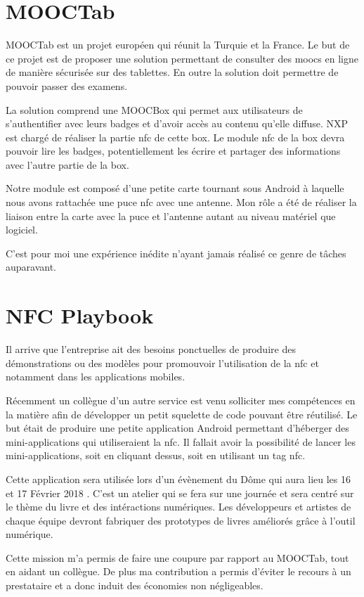 \documentclass[french,12pt,a4paper,titlepage,openright,openbib]{report}
\begin{document}
\section{MOOCTab}
MOOCTab est un projet européen qui réunit la Turquie et la France. Le but de ce projet est de proposer une solution permettant de consulter des \glspl{mooc} en ligne de manière sécurisée sur des tablettes. En outre la solution doit permettre de pouvoir passer des examens.

La solution comprend une MOOCBox qui permet aux utilisateurs de s'authentifier avec leurs badges et d'avoir accès au contenu qu'elle diffuse. NXP est chargé de réaliser la partie \gls{nfc} de cette box.
Le module \gls{nfc} de la box devra pouvoir lire les badges, potentiellement les écrire et partager des informations avec l'autre partie de la box.

Notre module est composé d'une petite carte tournant sous Android à laquelle nous avons rattachée une puce \gls{nfc} avec une antenne. Mon rôle a été de réaliser la liaison entre la carte avec la puce et l'antenne autant au niveau matériel que logiciel.

C'est pour moi une expérience inédite n'ayant jamais réalisé ce genre de tâches auparavant.
\section{NFC Playbook}
Il arrive que l'entreprise ait des besoins ponctuelles de produire des démonstrations ou des modèles pour promouvoir l'utilisation de la \gls{nfc} et notamment dans les applications mobiles.

Récemment un collègue d'un autre service est venu solliciter mes compétences en la matière afin de développer un petit squelette de code pouvant être réutilisé.
Le but était de produire une petite application Android permettant d'héberger des mini-applications qui utiliseraient la \gls{nfc}. Il fallait avoir la possibilité de lancer les mini-applications, soit en cliquant dessus, soit en utilisant un tag \gls{nfc}.

Cette application sera utilisée lors d'un évènement du Dôme qui aura lieu les 16 et 17 Février 2018 \cite{website:ledome}. C'est un atelier qui se fera sur une journée et sera centré sur le thème du livre et des intéractions numériques. Les développeurs et artistes de chaque équipe devront fabriquer des prototypes de livres améliorés grâce à l'outil numérique.

Cette mission m'a permis de faire une coupure par rapport au MOOCTab, tout en aidant un collègue. De plus ma contribution a permis d'éviter le recours à un prestataire et a donc induit des économies non négligeables.
\end{document}
